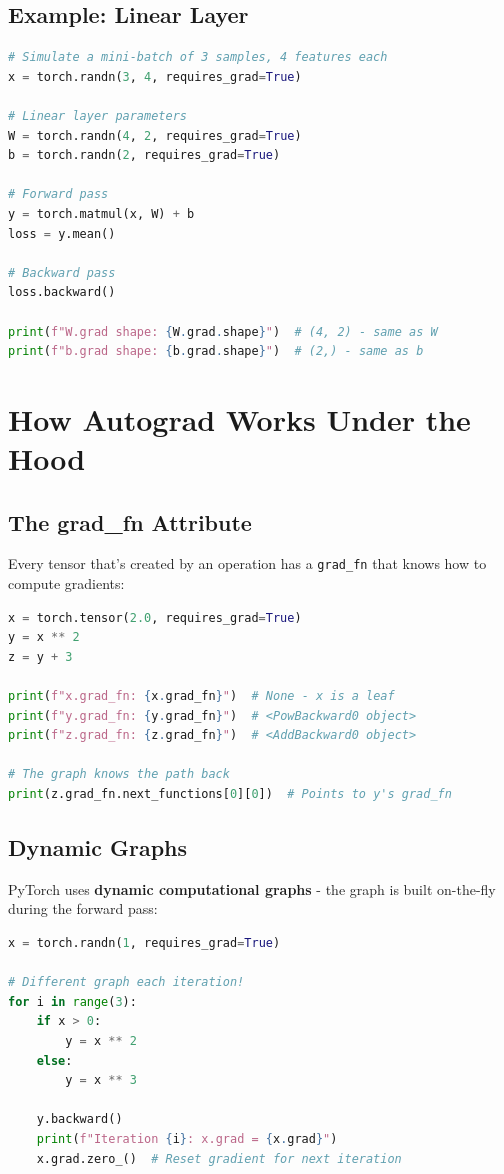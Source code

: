 \documentclass{article}
\begin{document}
\subsection{Example: Linear Layer}

\begin{lstlisting}[language=Python]
# Simulate a mini-batch of 3 samples, 4 features each
x = torch.randn(3, 4, requires_grad=True)

# Linear layer parameters
W = torch.randn(4, 2, requires_grad=True)
b = torch.randn(2, requires_grad=True)

# Forward pass
y = torch.matmul(x, W) + b
loss = y.mean()

# Backward pass
loss.backward()

print(f"W.grad shape: {W.grad.shape}")  # (4, 2) - same as W
print(f"b.grad shape: {b.grad.shape}")  # (2,) - same as b
\end{lstlisting}

\section{How Autograd Works Under the Hood}

\subsection{The grad\_fn Attribute}

Every tensor that's created by an operation has a \texttt{grad\_fn} that knows how to compute gradients:

\begin{lstlisting}[language=Python]
x = torch.tensor(2.0, requires_grad=True)
y = x ** 2
z = y + 3

print(f"x.grad_fn: {x.grad_fn}")  # None - x is a leaf
print(f"y.grad_fn: {y.grad_fn}")  # <PowBackward0 object>
print(f"z.grad_fn: {z.grad_fn}")  # <AddBackward0 object>

# The graph knows the path back
print(z.grad_fn.next_functions[0][0])  # Points to y's grad_fn
\end{lstlisting}

\subsection{Dynamic Graphs}

PyTorch uses \textbf{dynamic computational graphs} - the graph is built on-the-fly during the forward pass:

\begin{lstlisting}[language=Python]
x = torch.randn(1, requires_grad=True)

# Different graph each iteration!
for i in range(3):
    if x > 0:
        y = x ** 2
    else:
        y = x ** 3
    
    y.backward()
    print(f"Iteration {i}: x.grad = {x.grad}")
    x.grad.zero_()  # Reset gradient for next iteration
\end{lstlisting}
\end{document}
